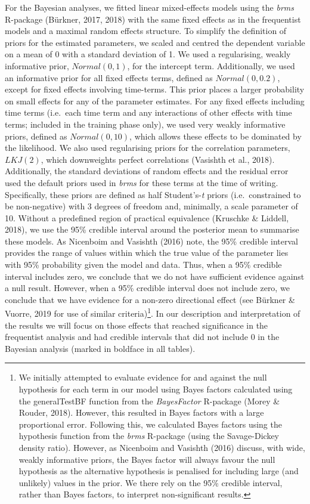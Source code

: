 \documentclass[doc,floatsintext]{apa6}
\let\rmarkdownfootnote\footnote%
\def\footnote{\protect\rmarkdownfootnote}
\begin{document}
For the Bayesian analyses, we fitted linear mixed-effects models using
the \emph{brms} R-package (Bürkner, 2017, 2018) with the same fixed
effects as in the frequentist models and a maximal random effects
structure. To simplify the definition of priors for the estimated
parameters, we scaled and centred the dependent variable on a mean of 0
with a standard deviation of 1. We used a regularising, weakly
informative prior, \(Normal(0, 1)\), for the intercept term.
Additionally, we used an informative prior for all fixed effects terms,
defined as \(Normal(0, 0.2)\), except for fixed effects involving
time-terms. This prior places a larger probability on small effects for
any of the parameter estimates. For any fixed effects including time
terms (i.e.~each time term and any interactions of other effects with
time terms; included in the training phase only), we used very weakly
informative priors, defined as \(Normal(0, 10)\), which allows these
effects to be dominated by the likelihood. We also used regularising
priors for the correlation parameters, \(LKJ(2)\), which downweights
perfect correlations (Vasishth et al., 2018). Additionally, the standard
deviations of random effects and the residual error used the default
priors used in \emph{brms} for these terms at the time of writing.
Specifically, these priors are defined as half Student's-\emph{t} priors
(i.e.~constrained to be non-negative) with 3 degrees of freedom and,
minimally, a scale parameter of 10. Without a predefined region of
practical equivalence (Kruschke \& Liddell, 2018), we use the 95\%
credible interval around the posterior mean to summarise these models.
As Nicenboim and Vasishth (2016) note, the 95\% credible interval
provides the range of values within which the true value of the
parameter lies with 95\% probability given the model and data. Thus,
when a 95\% credible interval includes zero, we conclude that we do not
have sufficient evidence against a null result. However, when a 95\%
credible interval does not include zero, we conclude that we have
evidence for a non-zero directional effect (see Bürkner \& Vuorre, 2019
for use of similar criteria)\footnote{We initially attempted to evaluate
  evidence for and against the null hypothesis for each term in our
  model using Bayes factors calculated using the generalTestBF function
  from the \emph{BayesFactor} R-package (Morey \& Rouder, 2018).
  However, this resulted in Bayes factors with a large proportional
  error. Following this, we calculated Bayes factors using the
  hypothesis function from the \emph{brms} R-package (using the
  Savage-Dickey density ratio). However, as Nicenboim and Vasishth
  (2016) discuss, with wide, weakly informative priors, the Bayes factor
  will always favour the null hypothesis as the alternative hypothesis
  is penalised for including large (and unlikely) values in the prior.
  We there rely on the 95\% credible interval, rather than Bayes
  factors, to interpret non-significant results.}. In our description
and interpretation of the results we will focus on those effects that
reached significance in the frequentist analysis and had credible
intervals that did not include 0 in the Bayesian analysis (marked in
boldface in all tables).
\end{document}
